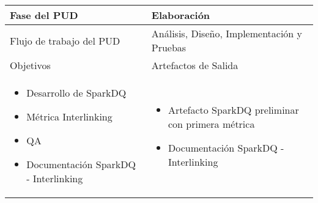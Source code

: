 \vspace{1cm}
\begin{tabular}{|p{}|p{}|}

\hline

\cellcolor[gray]{0.7}Fase del \acs{PUD} & Elaboración
 \\
\hline

\cellcolor[gray]{0.7}Flujo de trabajo del \acs{PUD} & Análisis, Diseño,
Implementación y Pruebas
 \\
\hline

\cellcolor[gray]{0.7}Objetivos  &
\cellcolor[gray]{0.7}Artefactos de Salida \\
\hline

\begin{itemize}
\item Desarrollo de SparkDQ
\item Métrica Interlinking
\item \acs{QA}
\item Documentación SparkDQ - Interlinking
\end{itemize}

&

\begin{itemize}
\item Artefacto SparkDQ preliminar con primera métrica
\item Documentación SparkDQ - Interlinking
\end{itemize}
\\
\hline
\end{tabular}


